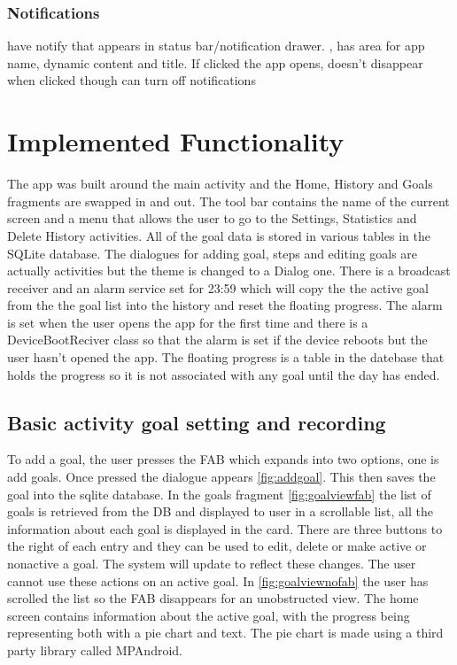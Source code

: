 \documentclass[12pt]{report}
\begin{document}
\subsubsection{Notifications}
have notify that appears in status bar/notification drawer. , has area for app name, dynamic content and title.
If clicked the app opens, doesn’t disappear when clicked though
can turn off notifications


\section{Implemented Functionality}

The app was built around the main activity and the Home, History and Goals fragments are swapped in and out. The tool bar contains the name of the current screen and a menu that allows the user to go to the Settings, Statistics and Delete History activities. All of the goal data is stored in various tables in the SQLite database. The dialogues for adding goal, steps and editing goals are actually activities but the theme is changed to a Dialog one. There is a broadcast receiver and an alarm service set for 23:59 which will copy the the active goal from the the goal list into the history and reset the floating progress. The alarm is set when the user opens the app for the first time and there is a DeviceBootReciver class so that the alarm is set if the device reboots but the user hasn't opened the app. The floating progress is a table in the datebase that holds the progress so it is not associated with any goal until the day has ended. 


\subsection{Basic activity goal setting and recording}

To add a goal, the user presses the FAB which expands into two options, one is add goals. Once pressed the dialogue appears \ref{fig:addgoal}. This then saves the goal into the sqlite database. In the goals fragment \ref{fig:goalviewfab} the list of goals is retrieved from the DB and displayed to user in a scrollable list, all the information about each goal is displayed in the card. There are three buttons to the right of each entry and they can be used to edit, delete or make active or nonactive a goal. The system will update to reflect these changes. The user cannot use these actions on an active goal. 
In \ref{fig:goalviewnofab} the user has scrolled the list so the FAB disappears for an unobstructed view. The home screen contains information about the active goal, with the progress being representing both with a pie chart and text. The pie chart is made using a third party library called MPAndroid.
\end{document}
